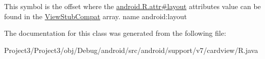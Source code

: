 This symbol is the offset where the \hyperlink{}{android.\+R.\+attr\#layout} attribute\textquotesingle{}s value can be found in the \hyperlink{classandroid_1_1support_1_1v7_1_1cardview_1_1R_1_1styleable_a3c298cbf9f98a627c6843548f42a8a58}{View\+Stub\+Compat} array.  name android\+:layout 

The documentation for this class was generated from the following file\+:\begin{DoxyCompactItemize}
\item 
Project3/\+Project3/obj/\+Debug/android/src/android/support/v7/cardview/R.\+java\end{DoxyCompactItemize}
